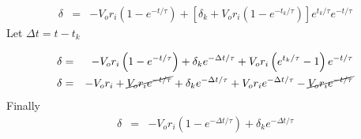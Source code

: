 \begin{eqnarray}
\delta &=& -V_{o} r_{i} \left(1 - e^{-t/\tau} \right) + \left[\delta_k + V_{o} r_{i} \left(1 - e^{-t_k/\tau} \right)\right] e^{t_k/\tau}e^{-t/\tau}
\end{eqnarray}
Let $\Delta t = t - t_k$

\begin{eqnarray}
\delta &=& -V_{o} r_{i} \left(1 - e^{-t/\tau} \right) + \delta_k e^{-\Delta t/\tau}+ V_{o} r_{i} \left(e^{t_k/\tau} - 1\right)e^{-t/\tau}\\
\delta &=& -V_{o} r_{i} + \cancel{V_{o} r_{i} e^{-t/\tau}} + \delta_k e^{-\Delta t/\tau}+ V_{o} r_{i} e^{-\Delta t/\tau} - \cancel{V_{o} r_{i} e^{-t/\tau}}
\end{eqnarray}
Finally
\begin{eqnarray}
\delta &=& -V_{o} r_{i} \left(1 - e^{-\Delta t/\tau}\right)  + \delta_k e^{-\Delta t/\tau}
\end{eqnarray}

